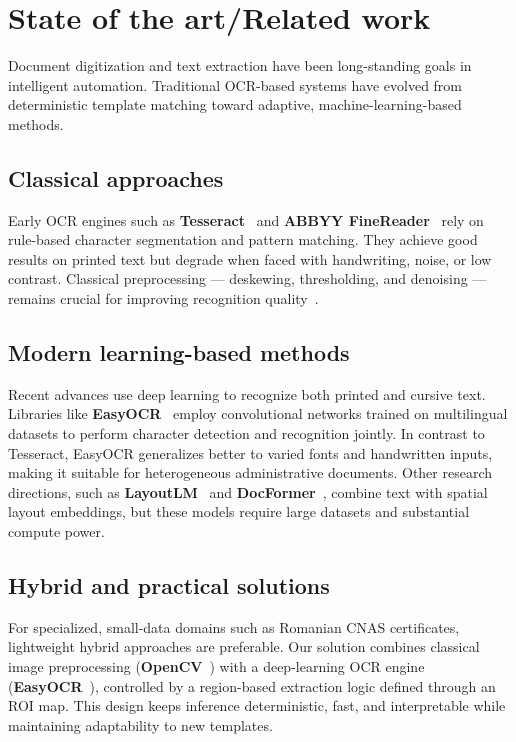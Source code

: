 \documentclass[runningheads,a4paper,11pt]{report}
\begin{document}


\chapter{State of the art/Related work}
\label{chapter:stateOfArt}

Document digitization and text extraction have been long-standing goals in intelligent automation.  
Traditional OCR-based systems have evolved from deterministic template matching toward adaptive, machine-learning-based methods.

\section{Classical approaches}
Early OCR engines such as \textbf{Tesseract}~\cite{Smith2007} and \textbf{ABBYY FineReader}~\cite{ABBYYFineReader} rely on rule-based character segmentation and pattern matching.  
They achieve good results on printed text but degrade when faced with handwriting, noise, or low contrast.  
Classical preprocessing --- deskewing, thresholding, and denoising --- remains crucial for improving recognition quality~\cite{Niblack1985,Sauvola2000}.

\section{Modern learning-based methods}
Recent advances use deep learning to recognize both printed and cursive text.  
Libraries like \textbf{EasyOCR}~\cite{JaidedAI2020} employ convolutional networks trained on multilingual datasets to perform character detection and recognition jointly.  
In contrast to Tesseract, EasyOCR generalizes better to varied fonts and handwritten inputs, making it suitable for heterogeneous administrative documents.  
Other research directions, such as \textbf{LayoutLM}~\cite{Xu2020} and \textbf{DocFormer}~\cite{Appalaraju2021}, combine text with spatial layout embeddings, but these models require large datasets and substantial compute power.

\section{Hybrid and practical solutions}
For specialized, small-data domains such as Romanian CNAS certificates, lightweight hybrid approaches are preferable.  
Our solution combines classical image preprocessing (\textbf{OpenCV}~\cite{Bradski2000}) with a deep-learning OCR engine (\textbf{EasyOCR}~\cite{JaidedAI2020}), controlled by a region-based extraction logic defined through an ROI map.  
This design keeps inference deterministic, fast, and interpretable while maintaining adaptability to new templates.
\end{document}
